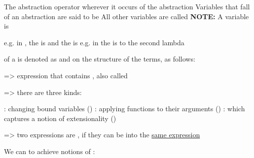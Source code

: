 \hSep

\begin{enumerate}
    \vItem The abstraction operator \iMbox{\lambda} 
    wherever it occurs  of the abstraction
    \vItem Variables that fall  of an abstraction are said to
    be 
    \vItem All other variables are called 
    \vItem \textbf{NOTE:} A variable is 
    \begin{enumerate}
        \vItem
        e.g. in , the  is
         and the  is 
        \vItem
        e.g. in  the  is
         to the second lambda
    \end{enumerate}
\end{enumerate}

\hSep

 of a 
 is denoted as  and 
on the structure of the terms, as follows:
\begin{enumerate}
    \vItem
    \vItem
    \vItem
\end{enumerate}

 => expression that contains ,
also called 

\hSep

 => there are three kinds:
\begin{itemize}
    \vItem {}: changing bound variables ()
    \vItem {}: applying functions to their arguments ()
    \vItem {}: which captures a notion of extensionality ()
\end{itemize}

 => two expressions are , if they can be
 into the \ul{same expression}
\begin{itemize}
    \vItem
    \vItem
    \vItem
    \vspace{1pt}

    \vItem We can  to achieve  notions of :
    \begin{enumerate}
        \vItem {}
    \end{enumerate}
\end{itemize}


